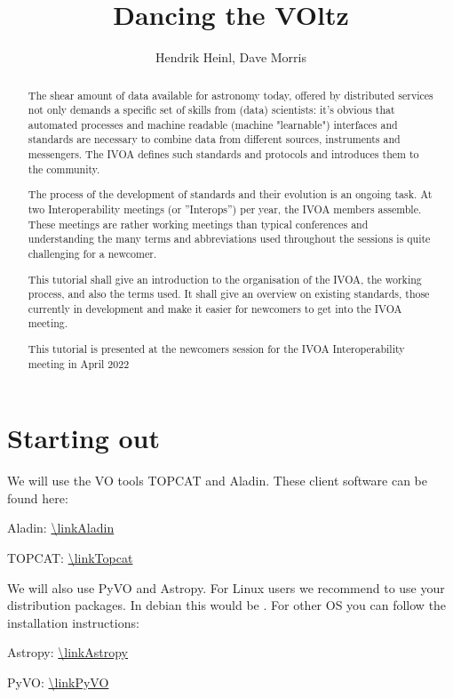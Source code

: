 \documentclass[twoside]{article}[12pt]
\title {Dancing the VOltz}
\author {Hendrik Heinl, Dave Morris}
\begin{document}
\maketitle 
 
\pagebreak
\begin {abstract}
The shear amount of data available for astronomy today, offered by
distributed services not only demands a specific set of skills from
(data) scientists: it's obvious that automated processes and machine
readable (machine "learnable") interfaces and standards are necessary to
combine data from different sources, instruments and messengers. The
IVOA defines such standards and protocols and introduces them to the
community. 

The process of the development of standards and their evolution is an
ongoing task. At two Interoperability meetings (or ''Interops'') per
year, the IVOA members assemble. These meetings are rather working
meetings than typical conferences and understanding the many terms and
abbreviations used throughout the sessions is quite challenging for a
newcomer.  

This tutorial shall give an introduction to the organisation of the
IVOA, the working process, and also the terms used. It shall give an
overview on existing standards, those currently in development and make
it easier for newcomers to get into the IVOA meeting.

This tutorial is presented at the newcomers session for the IVOA
Interoperability meeting in April 2022\end{abstract}



\section{Starting out}
We will use the VO tools TOPCAT and Aladin. These client
software can be found here:

Aladin: \url{\linkAladin}

TOPCAT: \url{\linkTopcat}

We will also use PyVO and Astropy. For Linux users we recommend to use
your distribution packages. In debian this would be 
. For other OS you can
follow the installation instructions:

Astropy: \url{\linkAstropy}

PyVO: \url{\linkPyVO}
\end{document}
